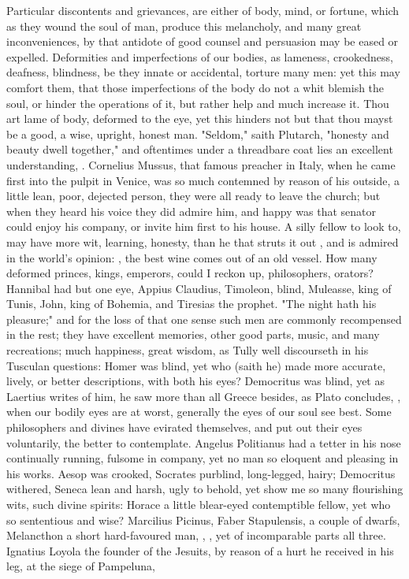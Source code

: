 {Particular discontents and grievances, are either of body, mind, or fortune, which as they wound the soul of man, produce this melancholy, and many great inconveniences, by that antidote of good counsel and persuasion may be eased or expelled. Deformities and imperfections of our bodies, as lameness, crookedness, deafness, blindness, be they innate or accidental, torture many men: yet this may comfort them, that those imperfections of the body do not a whit blemish the soul, or hinder the operations of it, but rather help and much increase it. Thou art lame of body, deformed to the eye, yet this hinders not but that thou mayst be a good, a wise, upright, honest man. "Seldom," saith Plutarch, "honesty and beauty dwell together," and oftentimes under a threadbare coat lies an excellent understanding, . Cornelius Mussus, that famous preacher in Italy, when he came first into the pulpit in Venice, was so much contemned by reason of his outside, a little lean, poor, dejected person, they were all ready to leave the church; but when they heard his voice they did admire him, and happy was that senator could enjoy his company, or invite him first to his house. A silly fellow to look to, may have more wit, learning, honesty, than he that struts it out , and is admired in the world's opinion: , the best wine comes out of an old vessel. How many deformed princes, kings, emperors, could I reckon up, philosophers, orators? Hannibal had but one eye, Appius Claudius, Timoleon, blind, Muleasse, king of Tunis, John, king of Bohemia, and Tiresias the prophet. "The night hath his pleasure;" and for the loss of that one sense such men are commonly recompensed in the rest; they have excellent memories, other good parts, music, and many recreations; much happiness, great wisdom, as Tully well discourseth in his Tusculan questions: Homer was blind, yet who (saith he) made more accurate, lively, or better descriptions, with both his eyes? Democritus was blind, yet as Laertius writes of him, he saw more than all Greece besides, as Plato concludes, , when our bodily eyes are at worst, generally the eyes of our soul see best. Some philosophers and divines have evirated themselves, and put out their eyes voluntarily, the better to contemplate. Angelus Politianus had a tetter in his nose continually running, fulsome in company, yet no man so eloquent and pleasing in his works. Aesop was crooked, Socrates purblind, long-legged, hairy; Democritus withered, Seneca lean and harsh, ugly to behold, yet show me so many flourishing wits, such divine spirits: Horace a little blear-eyed contemptible fellow, yet who so sententious and wise? Marcilius Picinus, Faber Stapulensis, a couple of dwarfs, Melancthon a short hard-favoured man, , \etc{}, yet of incomparable parts all three. Ignatius Loyola the founder of the Jesuits, by reason of a hurt he received in his leg, at the siege of Pampeluna, }

